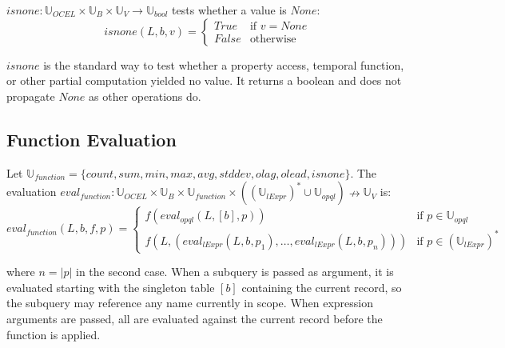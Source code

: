 \begin{frameddef}[isnone]
$isnone : \mathbb{U}_{OCEL} \times \mathbb{U}_B \times \mathbb{U}_V \to \mathbb{U}_{bool}$ tests whether a value is $None$:
\[
isnone(L, b, v) = \begin{cases}
True & \text{if } v = None \\
False & \text{otherwise}
\end{cases}
\]
\end{frameddef}

$isnone$ is the standard way to test whether a property access, temporal function, or other partial computation yielded no value. It returns a boolean and does not propagate $None$ as other operations do.

\subsection{Function Evaluation}

\begin{frameddef}
Let $\mathbb{U}_{function} = \{ count, sum, min, max, avg, stddev, olag, olead, isnone \}$. The evaluation $eval_{function} : \mathbb{U}_{OCEL} \times \mathbb{U}_B \times \mathbb{U}_{function} \times ((\mathbb{U}_{lExpr})^* \cup \mathbb{U}_{opql}) \nrightarrow \mathbb{U}_V$ is:
\[
eval_{function}(L, b, f, p) = \begin{cases}
f(eval_{opql}(L, [b], p)) & \text{if } p \in \mathbb{U}_{opql} \\
f(L, (eval_{lExpr}(L, b, p_1), \dots, eval_{lExpr}(L, b, p_n))) & \text{if } p \in (\mathbb{U}_{lExpr})^*
\end{cases}
\]
\end{frameddef}

where $n = |p|$ in the second case. When a subquery is passed as argument, it is evaluated starting with the singleton table $[b]$ containing the current record, so the subquery may reference any name currently in scope. When expression arguments are passed, all are evaluated against the current record before the function is applied.
